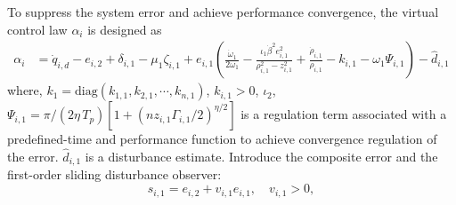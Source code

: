 \documentclass[pdflatex,sn-mathphys-num]{sn-jnl}%
\theoremstyle{thmstyleone}%
\theoremstyle{thmstyletwo}%
\theoremstyle{thmstylethree}%
\begin{document}
To suppress the system error and achieve performance convergence, the virtual control law $\alpha_i$ is designed as 
\begin{equation}	\label{eq:30}
	\begin{aligned}
	\alpha_i
	&= \dot q_{i,d}-e_{i,2}+\delta_{i,1}-\mu_1 \zeta_{i,1}+e_{i,1}\left( \frac{\dot{\omega}_{1}}{2 \omega_{1}}-\frac{\iota_1  \dot{\beta}^{2} e_{i,1}^{2} }{\rho_{i,1}^{2} - z_{i,1}^{2}} 
	+\frac{\dot\rho_{i,1}}{\rho_{i,1}} - k_{i,1} 
	- \omega_{1} \Psi_{i,1}   \right)-{\hat d}_{i,1}
\end{aligned}
\end{equation}
where, $k_{1}=\text{diag}(k_{1,1}, k_{2,1},\cdots, k_{n,1})$, $k_{i,1}>0 $, $\iota_2$, $\Psi_{i,1}={\pi}/({2 \eta\,T_p})[1+(n z_{i,1}\varGamma_{i,1}/2)^{{\eta}/{2}}]$ is a regulation term associated with a predefined-time and performance function to achieve convergence regulation of the error. \(\hat d_{i,1}\) is a disturbance estimate.
Introduce the composite error and the first-order sliding disturbance observer:
\begin{equation}\label{eq:31}
	 s_{i,1} = e_{i,2} + v_{i,1} e_{i,1}, \quad v_{i,1}>0,
\end{equation}
\end{document}
